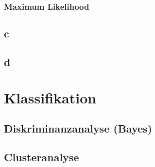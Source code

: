 \documentclass[10pt]{article}
\begin{document}
\subsubsection{Maximum Likelihood}

\subsection{c}

\subsection{d}




\section{Klassifikation}

\subsection{Diskriminanzanalyse (Bayes)}

\subsection{Clusteranalyse}
\end{document}

